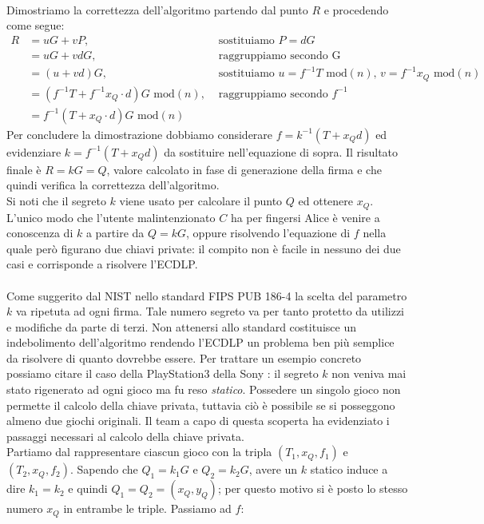 \documentclass[a4paper,12pt]{tesiinfo}
\begin{document}
\\
Dimostriamo la correttezza dell'algoritmo partendo dal punto $R$ e procedendo come segue:
\begin{align*}
 R &= uG + vP, &\text{ sostituiamo } P = dG\\
 &= uG + vdG, &\text{ raggruppiamo secondo G }\\
 &= (u + vd)G, &\text{ sostituiamo } u = f^{-1}T \text{ mod$(n)$, } v = f^{-1}x_Q\text{ mod$(n)$}\\
 &= (f^{-1}T + f^{-1}x_Q \cdot d)G\text{ mod$(n)$}, &\text{ raggruppiamo secondo } f^{-1}\\
 &= f^{-1}(T + x_Q \cdot d)G\text{ mod$(n)$}
\end{align*}
Per concludere la dimostrazione dobbiamo considerare $f = k^{-1} (T+x_Qd)$ ed evidenziare $k = f^{-1} (T+x_Qd)$ da sostituire nell'equazione di sopra. Il risultato finale \`e $R = kG = Q$, valore calcolato in fase di generazione della firma e che quindi verifica la correttezza dell'algoritmo.
\\
Si noti che il segreto $k$ viene usato per calcolare il punto $Q$ ed ottenere $x_Q$. L'unico modo che l'utente malintenzionato $C$ ha per fingersi Alice \`e venire a conoscenza di $k$ a partire da $Q = kG$, oppure risolvendo l'equazione di $f$ nella quale per\`o figurano due chiavi private: il compito non \`e facile in nessuno dei due casi e corrisponde a risolvere l'ECDLP.
\\
\\
Come suggerito dal NIST nello standard FIPS PUB 186-4 \cite{dss} la scelta del parametro $k$ va ripetuta ad ogni firma. Tale numero segreto va per tanto protetto da utilizzi e modifiche da parte di terzi. Non attenersi allo standard costituisce un indebolimento dell'algoritmo rendendo l'ECDLP un problema ben pi\`u semplice da risolvere di quanto dovrebbe essere. Per trattare un esempio concreto possiamo citare il caso della PlayStation3 della Sony \cite{sony}: il segreto $k$ non veniva mai stato rigenerato ad ogni gioco ma fu reso \textit{statico}. Possedere un singolo gioco non permette il calcolo della chiave privata, tuttavia ci\`o \`e possibile se si posseggono almeno due giochi originali. Il team a capo di questa scoperta ha evidenziato i passaggi necessari al calcolo della chiave privata. 
\\
Partiamo dal rappresentare ciascun gioco con la tripla $(T_1, x_Q, f_1)$ e $(T_2, x_Q, f_2)$. Sapendo che $Q_1 = k_1G$ e $Q_2 = k_2G$, avere un $k$ statico induce a dire $k_1=k_2$ e quindi $Q_1=Q_2=(x_Q, y_Q)$; per questo motivo si \`e posto lo stesso numero $x_Q$ in entrambe le triple. Passiamo ad $f$:
\end{document}
